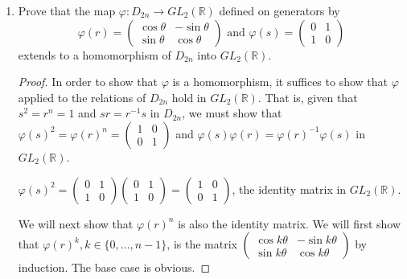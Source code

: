 \documentclass{article}
\begin{document}
\begin{enumerate}[label=(\alph*)]
\begin{proof}
\begin{equation*}
            \end{equation*}
            This proves that the given matrix rotates the $x, y$ plane counterclockwise about the origin by $\theta$ radians.
          \end{proof}
    \item Prove that the map $\varphi: D_{2n} \rightarrow GL_2(\mathbb{R})$ defined on generators by 
          \begin{equation*}
            \varphi(r) = \begin{pmatrix}\cos \theta & -\sin \theta \\ \sin \theta & \cos \theta\end{pmatrix} \text{ and } \varphi(s) = \begin{pmatrix}0 & 1 \\ 1 & 0\end{pmatrix}
          \end{equation*}
          extends to a homomorphism of $D_{2n}$ into $GL_2(\mathbb{R})$.
          \begin{proof}
            In order to show that $\varphi$ is a homomorphism, it suffices to show that $\varphi$ applied to the relations of $D_{2n}$ hold in $GL_2(\mathbb{R})$. That is, given that $s^2 = r^n = 1$ and $sr = r^{-1}s$ in $D_{2n}$, we must show that $\varphi(s)^2 = \varphi(r)^n = \begin{pmatrix}1 & 0 \\ 0 & 1\end{pmatrix}$ and $\varphi(s)\varphi(r) = \varphi(r)^{-1}\varphi(s)$ in $GL_2(\mathbb{R})$.

            $\varphi(s)^2 = \begin{pmatrix}0 & 1 \\ 1 & 0\end{pmatrix}\begin{pmatrix}0 & 1 \\ 1 & 0\end{pmatrix} = \begin{pmatrix}1 & 0 \\ 0 & 1\end{pmatrix}$, the identity matrix in $GL_2(\mathbb{R})$.

            We will next show that $\varphi(r)^n$ is also the identity matrix. We will first show that $\varphi(r)^k, k \in \{0, ..., n - 1 \}$, is the matrix $\begin{pmatrix}\cos k \theta & -\sin k \theta \\ \sin k \theta & \cos k \theta\end{pmatrix}$ by induction. The base case is obvious.


\end{proof}
\end{enumerate}
\end{document}
